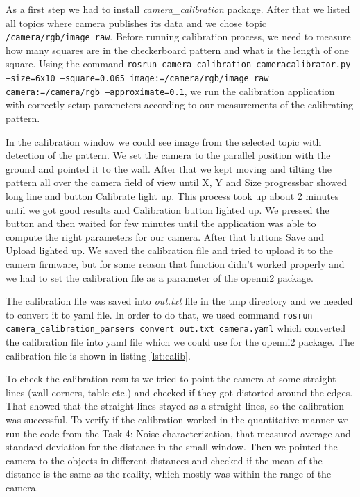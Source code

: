 \documentclass[11pt]{article}
\begin{document}
	As a first step we had to install \emph{camera\_calibration} package. After that we listed all topics where camera publishes its data and we chose topic \texttt{/camera/rgb/image\_raw}. Before running calibration process, we need to measure how many squares are in the checkerboard pattern and what is the length of one square. Using the command \texttt{rosrun camera\_calibration cameracalibrator.py --size=6x10 --square=0.065 image:=/camera/rgb/image\_raw{ }}\texttt{camera:=/camera/rgb --approximate=0.1}, we run the calibration application with correctly setup parameters according to our measurements of the calibrating pattern. \par 
	In the calibration window we could see image from the selected topic with detection of the pattern. We set the camera to the parallel position with the ground and pointed it to the wall. After that we kept moving and tilting the pattern all over the camera field of view until X, Y and Size progressbar showed long line and button Calibrate light up. This process took up about 2 minutes until we got good results and Calibration button lighted up. We pressed the button and then waited for few minutes until the application was able to compute the right parameters for our camera. After that buttons Save and Upload lighted up. We saved the calibration file and tried to upload it to the camera firmware, but for some reason that function didn't worked properly and we had to set the calibration file as a parameter of the openni2 package. \par
	The calibration file was saved into \emph{out.txt} file in the tmp directory and we needed to convert it to yaml file. In order to do that, we used command \texttt{rosrun camera\_calibration\_parsers convert  out.txt camera.yaml} which converted the calibration file into yaml file which we could use for the openni2 package. The calibration file is shown in listing \vref{lst:calib}. \par
        
	To check the calibration results we tried to point the camera at some straight lines (wall corners, table etc.) and checked if they got distorted around the edges. That showed that the straight lines stayed as a straight lines, so the calibration was successful. To verify if the calibration worked in the quantitative manner we run the code from the Task 4: Noise characterization, that measured average and standard deviation for the distance in the small window. Then we pointed the camera to the objects in different distances and checked if the mean of the distance is the same as the reality, which mostly was within the range of the camera. \par
	
\end{document}
